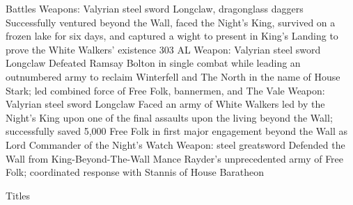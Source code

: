 \documentclass[]{resume-knyte}
\begin{document}
\begin{topic}{Battles}
    {Weapons: Valyrian steel sword Longclaw, dragonglass daggers}
    {Successfully ventured beyond the Wall, faced the Night's King,
    survived on a frozen lake for six days, and captured a wight to present
    in King's Landing to prove the White Walkers' existence}
    {303 AL}
    {Weapon: Valyrian steel sword Longclaw}
    {Defeated Ramsay Bolton in single combat while leading an outnumbered
    army to reclaim Winterfell and The North in the name of House Stark;
    led combined force of Free Folk, bannermen, and The Vale}
    {Weapon: Valyrian steel sword Longclaw}
    {Faced an army of White Walkers led by the Night's King upon one of the
    final assaults upon the living beyond the Wall; successfully saved 5,000
    Free Folk in first major engagement beyond the Wall as Lord Commander of
    the Night's Watch}
    {Weapon: steel greatsword}
    {Defended the Wall from King-Beyond-The-Wall Mance Rayder's unprecedented
    army of Free Folk; coordinated response with Stannis of House Baratheon}
\end{topic}

\begin{topic}{Titles}
    \\
    \\
\end{topic}
\end{document}
